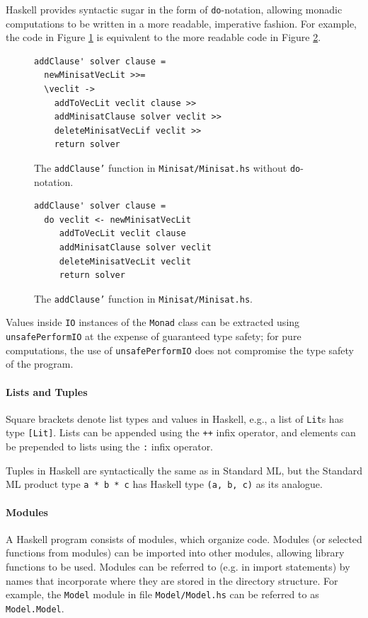 \documentclass[12pt,a4paper,twoside,openright]{report}
\begin{document}
{Haskell provides syntactic sugar
in the form of \verb,do,-notation, allowing monadic computations
to be written in a more readable, imperative fashion. For example, the code in Figure
\ref{monad} is equivalent to the more readable code in Figure \ref{do}.

\begin{figure}[t]
\centering
\begin{lstlisting}
addClause' solver clause =
  newMinisatVecLit >>=
  \veclit ->
    addToVecLit veclit clause >> 
    addMinisatClause solver veclit >>
    deleteMinisatVecLif veclit >>
    return solver
\end{lstlisting}
\caption{The {\tt addClause'} function in {\tt Minisat/Minisat.hs} without
{\tt do}-notation.}
\label{monad}
\end{figure}
\begin{figure}[t]
\centering
\begin{lstlisting}
addClause' solver clause =
  do veclit <- newMinisatVecLit
     addToVecLit veclit clause
     addMinisatClause solver veclit
     deleteMinisatVecLit veclit
     return solver
\end{lstlisting}
\caption{The {\tt addClause'} function in {\tt Minisat/Minisat.hs}.}
\label{do}
\end{figure}

Values inside \verb,IO, instances of the \verb,Monad, class can be extracted
using \verb,unsafePerformIO, at the expense of guaranteed type safety; for pure
computations, the use of \verb,unsafePerformIO, does not compromise the type
safety of the program.
}

\paragraph{Lists and Tuples}{
Square brackets denote list types and values in Haskell, e.g.,
a list of \verb,Lit,s has type \verb,[Lit],.
Lists can be appended using the \verb,++, infix operator, and elements
can be prepended to lists using the \verb,:, infix operator.

Tuples in Haskell are syntactically the same as in Standard ML, but the
Standard ML product type \verb,a * b * c, has Haskell type \verb.(a, b, c).
as its analogue.
}

\paragraph{Modules}{
A Haskell program consists of modules, which organize code.
Modules (or selected functions from modules) can be imported into other
modules, allowing library functions to be used. Modules can be referred
to (e.g. in import statements) by names that incorporate where they are
stored in the directory structure. For example, the \verb,Model, module in file
\verb,Model/Model.hs, can be referred to as \verb,Model.Model,.
}
\end{document}
